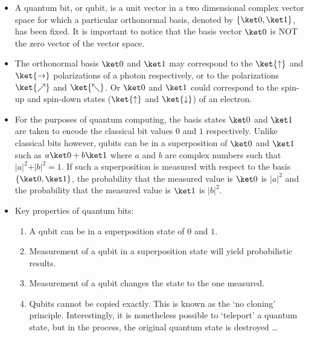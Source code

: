 \documentclass{slides}
\begin{document}
\begin{slide}{}


\begin{itemize}
	\item A quantum bit, or qubit, is a unit vector in a two dimensional
complex vector space for which a particular orthonormal basis, denoted by
$\{\ket 0, \ket 1\}$, 
has been fixed. It is important to notice that the basis vector $\ket 0$ is NOT the zero vector of the vector space.
\item The orthonormal basis
$\ket 0$ and $\ket 1$ may correspond to the $\ket{\uparrow}$ and 
$\ket{\to}$ polarizations of a photon respectively, or to the polarizations
$\ket{\nearrow}$ and $\ket{\nwarrow}$. Or $\ket 0$ and $\ket 1$ could 
correspond to the spin-up and spin-down states ($\ket{\uparrow}$ and $\ket{\downarrow}$) of an electron.
\end{itemize}

\end{slide}

\begin{slide}{}
\begin{itemize}

\item For the purposes of quantum computing, the basis states $\ket 0$ and $\ket 1$ 
are taken to encode the classical bit values
$0$ and $1$ respectively. 
Unlike classical bits however, qubits can be in a superposition of
$\ket 0$ and $\ket 1$ such as $a\ket 0 + b\ket 1$
where $a$ and $b$ are complex numbers such that 
$\vert a\vert^2 + \vert b\vert^2 = 1$. If such a superposition is measured with
respect to the basis $\{\ket 0,\ket 1\}$, the probability that the 
measured value is $\ket 0$ is $\vert a\vert ^2$ and the probability that the
measured value is $\ket 1$ is  $\vert b\vert ^2$.

\end{itemize}

\end{slide}

\begin{slide}{}
\begin{itemize}

\item Key properties of quantum bits:
 \begin{enumerate}
 \item A qubit can be in a superposition state of $0$ and $1$.  
 \item Measurement of a qubit in a superposition state will yield
 probabilistic results.
 \item Measurement of a qubit changes the state to the one measured.
 \item Qubits cannot be copied exactly.  This is known as the `no cloning' principle.  Interestingly, it is nonetheless possible to `teleport' a quantum state, but in the process, the original quantum state is destroyed \ldots
 \end{enumerate}

\end{itemize}

\end{slide}
\end{document}
